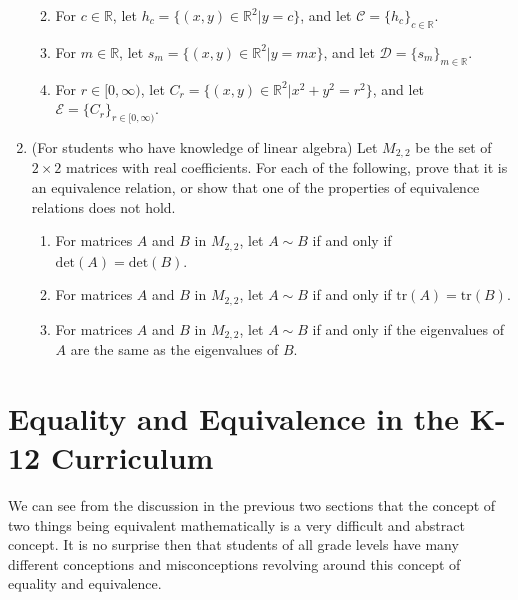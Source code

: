 \documentclass[
]{book}
\providecommand{\tightlist}{%
  \setlength{\itemsep}{0pt}\setlength{\parskip}{0pt}}
\let\stdsection\section
\renewcommand\section{\newpage\stdsection}
\theoremstyle{definition}
\theoremstyle{definition}
\theoremstyle{definition}
\theoremstyle{definition}
\theoremstyle{remark}
\begin{document}
\begin{enumerate}
  \begin{enumerate}
  \def\labelenumii{\alph{enumii}.}
  \tightlist
  \item
    For \(c\in \mathbb{R}\), let \(h_c= \{ (x,y)\in \mathbb{R}^2 \vert y=c\}\), and let \(\mathcal{C} = \{h_c\}_{c\in \mathbb{R}}\).
  \item
    For \(m\in \mathbb{R}\), let \(s_m=\{ (x,y)\in \mathbb{R}^2 \vert y=mx\}\), and let \(\mathcal{D}= \{s_m\}_{m\in \mathbb{R}}\).
  \item
    For \(r\in [0,\infty)\), let \(C_r=\{ (x,y) \in \mathbb{R}^2 \vert x^2+y^2=r^2\}\), and let \(\mathcal{E}=\{C_r\}_{r\in [0,\infty)}\).
  \end{enumerate}
\item
  (For students who have knowledge of linear algebra) Let \(M_{2,2}\) be the set of \(2 \times 2\) matrices with real coefficients. For each of the following, prove that it is an equivalence relation, or show that one of the properties of equivalence relations does not hold.

  \begin{enumerate}
  \def\labelenumii{\alph{enumii}.}
  \tightlist
  \item
    For matrices \(A\) and \(B\) in \(M_{2,2}\), let \(A \sim B\) if and only if \(\mathrm{det}(A)=\mathrm{det}(B)\).
  \item
    For matrices \(A\) and \(B\) in \(M_{2,2}\), let \(A \sim B\) if and only if \(\mathrm{tr}(A)=\mathrm{tr}(B)\).
  \item
    For matrices \(A\) and \(B\) in \(M_{2,2}\), let \(A \sim B\) if and only if the eigenvalues of \(A\) are the same as the eigenvalues of \(B\).
  \end{enumerate}
\end{enumerate}

\hypertarget{equality-and-equivalence-in-the-k-12-curriculum}{%
\section{Equality and Equivalence in the K-12 Curriculum}\label{equality-and-equivalence-in-the-k-12-curriculum}}

We can see from the discussion in the previous two sections that the concept of two things being equivalent mathematically is a very difficult and abstract concept. It is no surprise then that students of all grade levels have many different conceptions and misconceptions revolving around this concept of equality and equivalence.
\end{document}
